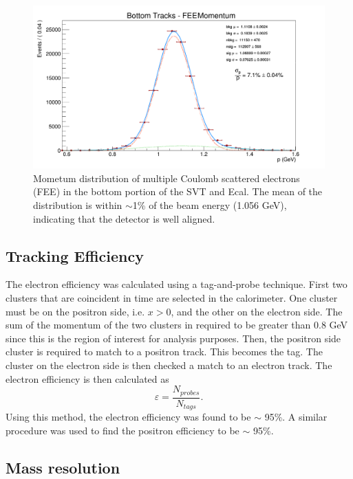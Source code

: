 \begin{figure}[h!b]
    \centering
    \includegraphics[width=.95\textwidth]{images/20160424_fee_bottom_tracks_p.png}
    \caption{Mometum distribution of multiple Coulomb scattered electrons (FEE) in
             the bottom portion of the SVT and Ecal.
             The mean of the distribution 
             is within $\sim$1\% of the beam energy (1.056 GeV), indicating that 
             the detector is well aligned.}
    \label{fig:bot_p}
\end{figure}

\subsection{Tracking Efficiency}

The electron efficiency was calculated using a tag-and-probe technique.  First
two clusters that are coincident in time are selected in the calorimeter. One
cluster must be on the positron side, i.e. $x > 0$, and the other on the electron
side.  The sum of the momentum of the two clusters in required to be greater 
than 0.8 GeV since this is the region of interest for analysis purposes. Then, 
the positron side cluster is required to match to a positron track.  This 
becomes the tag.  The cluster on the electron side is then checked a 
match to an electron track.  The electron efficiency is then calculated as 
\begin{equation}
    \varepsilon = \frac{N_{probes}}{N_{tags}}.
\end{equation}
Using this method, the electron efficiency was found to be $\sim$ 95\%. A similar
procedure was used to find the positron efficiency to be $\sim$ 95\%.

\subsection{Mass resolution} \label{sec:mass_res}

